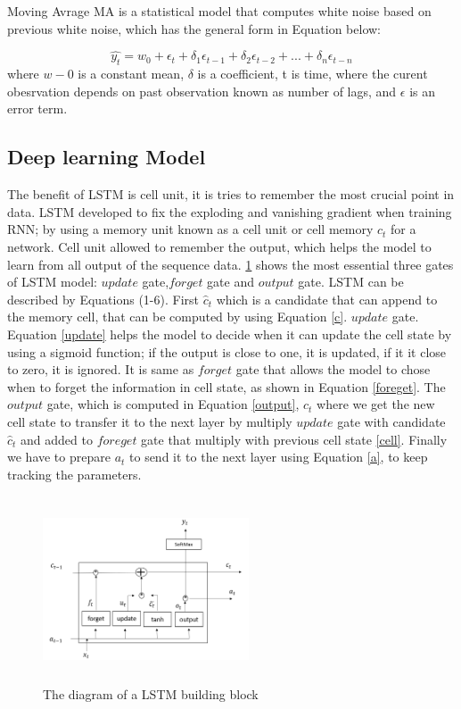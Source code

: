 \documentclass[10pt, conference, compsocconf]{IEEEtran}
\begin{document}
Moving Avrage MA is a statistical model that computes white noise based on previous white noise, which has the general form in Equation below:

\begin{equation}
\hat{y_t} = w_0 +\epsilon_t + \delta_1 \epsilon_{t-1}+  \delta_2 \epsilon_{t-2}+...+ \delta_n \epsilon_{t-n}
\label{Eq-MA}
\end{equation}
where \(w-0\) is a constant mean, \(\delta\) is a coefficient, t is time, where the curent obesrvation depends on past observation known as number of lags, and \(\epsilon\) is an error term.

\subsection{Deep learning Model}
The benefit of LSTM is cell unit, it is tries to remember the most crucial point in data. LSTM developed to fix the exploding and vanishing gradient when training RNN; by using a memory unit known as a cell unit or cell memory \(c_t\)  for a network. Cell unit allowed to remember the output, which helps the model to learn from all output of the sequence data.
\ref{fig:LSTM} shows the most essential three gates of LSTM model: \(update\) gate,\(forget\) gate and \( output \) gate. LSTM can be described by Equations (1-6). First \(\hat c_t\) which is a candidate that can append to the memory cell, that can be computed by using
 Equation \ref{c}. \(update\) gate. Equation \ref{update} helps the model to decide when it can update the cell state by using a sigmoid function; if the output is close to one, it is updated, if it it close to zero, it is ignored. It is same as \(forget\) gate that allows the model to chose when to forget the information in cell state, as shown in Equation \ref{foreget}. The \(output \) gate,  which is computed in Equation \ref{output}, \(c_t\) where we get the new cell state to transfer it to the next layer by multiply \(update\) gate with candidate $\hat c_t$ and added to \(foreget\) gate that multiply with previous  cell state \ref{cell}. Finally we have to prepare \(a_t\) to send it to the next layer using Equation \ref{a}, to keep tracking the parameters.
\begin{figure}[h]
 \includegraphics[width=6.1cm, height=5.5cm]{lstm}
 \caption{\footnotesize The diagram of a LSTM building block}
 \label{fig:LSTM}
\end{figure}
\end{document}
